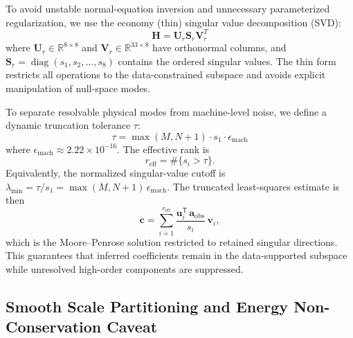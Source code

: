\documentclass[11pt,a4paper]{article}
\begin{document}
To avoid unstable normal-equation inversion and unnecessary parameterized regularization, we use the economy (thin) singular value decomposition (SVD):
\begin{equation}
\mathbf{H} = \mathbf{U}_r \mathbf{S}_r \mathbf{V}_r^T
\label{eq:thin_svd}
\end{equation}
where $\mathbf{U}_r \in \mathbb{R}^{8 \times 8}$ and $\mathbf{V}_r \in \mathbb{R}^{33 \times 8}$ have orthonormal columns, and $\mathbf{S}_r = \operatorname{diag}(s_1, s_2, \ldots, s_8)$ contains the ordered singular values. The thin form restricts all operations to the data-constrained subspace and avoids explicit manipulation of null-space modes.

To separate resolvable physical modes from machine-level noise, we define a dynamic truncation tolerance $\tau$:
\begin{equation}
\tau = \max\left(M, N+1\right) \cdot s_1 \cdot \epsilon_{\mathrm{mach}}
\label{eq:dynamic_tolerance}
\end{equation}
where $\epsilon_{\mathrm{mach}} \approx 2.22 \times 10^{-16}$. The effective rank is
\begin{equation}
r_{\mathrm{eff}} = \#\{s_i > \tau\}.
\label{eq:effective_rank}
\end{equation}
Equivalently, the normalized singular-value cutoff is $\lambda_{\mathrm{min}} = \tau / s_1 = \max(M, N+1)\,\epsilon_{\mathrm{mach}}$. The truncated least-squares estimate is then
\begin{equation}
\mathbf{c} = \sum_{i=1}^{r_{\mathrm{eff}}} \frac{\mathbf{u}_i^{\mathsf{T}}\,\mathbf{a}_{\mathrm{obs}}}{s_i}\,\mathbf{v}_i,
\label{eq:svd_reconstruction}
\end{equation}
which is the Moore--Penrose solution restricted to retained singular directions. This guarantees that inferred coefficients remain in the data-supported subspace while unresolved high-order components are suppressed.

\subsection{Smooth Scale Partitioning and Energy Non-Conservation Caveat}
\label{sec:methods:partition}
\end{document}
